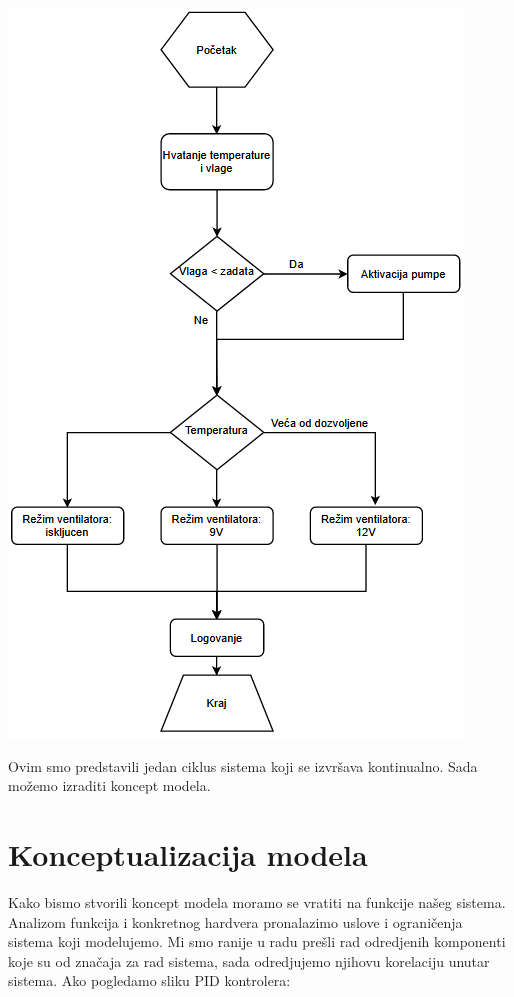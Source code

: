 \documentclass[a4paper,11pt]{book}
\begin{document}
\includegraphics[width=\textwidth]{flow.png}

Ovim smo predstavili jedan ciklus sistema koji se izvršava kontinualno. Sada možemo izraditi koncept modela.

\section{Konceptualizacija modela}

Kako bismo stvorili koncept modela moramo se vratiti na funkcije našeg sistema. Analizom funkcija i konkretnog hardvera pronalazimo uslove i ograničenja sistema koji modelujemo. Mi smo ranije u radu prešli rad odredjenih komponenti koje su od značaja za rad sistema, sada odredjujemo njihovu korelaciju unutar sistema. Ako pogledamo sliku PID kontrolera:
\end{document}
